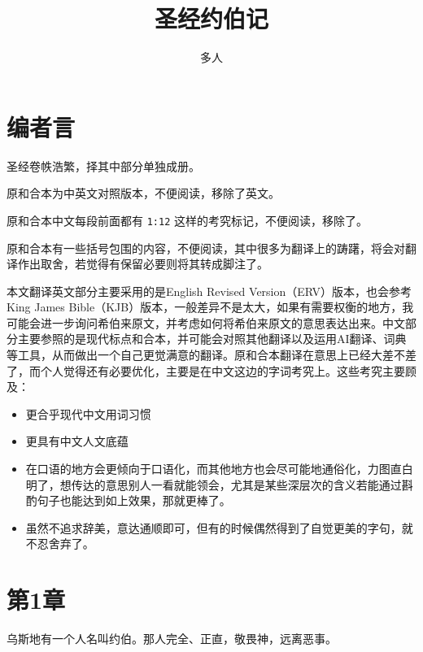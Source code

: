 \documentclass[12pt,oneside]{book}
\title{圣经约伯记}
\author{多人}
\begin{document}





\frontmatter
{}
\chapter*{编者言}
圣经卷帙浩繁，择其中部分单独成册。

原和合本为中英文对照版本，不便阅读，移除了英文。

原和合本中文每段前面都有 \verb+1:12+ 这样的考究标记，不便阅读，移除了。

原和合本有一些括号包围的内容，不便阅读，其中很多为翻译上的踌躇，将会对翻译作出取舍，若觉得有保留必要则将其转成脚注了。

本文翻译英文部分主要采用的是English Revised Version（ERV）版本，也会参考King James Bible（KJB）版本，一般差异不是太大，如果有需要权衡的地方，我可能会进一步询问希伯来原文，并考虑如何将希伯来原文的意思表达出来。中文部分主要参照的是现代标点和合本，并可能会对照其他翻译以及运用AI翻译、词典等工具，从而做出一个自己更觉满意的翻译。原和合本翻译在意思上已经大差不差了，而个人觉得还有必要优化，主要是在中文这边的字词考究上。这些考究主要顾及：


\begin{itemize}
\item 更合乎现代中文用词习惯
\item 更具有中文人文底蕴
\item 在口语的地方会更倾向于口语化，而其他地方也会尽可能地通俗化，力图直白明了，想传达的意思别人一看就能领会，尤其是某些深层次的含义若能通过斟酌句子也能达到如上效果，那就更棒了。
\item 虽然不追求辞美，意达通顺即可，但有的时候偶然得到了自觉更美的字句，就不忍舍弃了。
\end{itemize}



\setcounter{tocdepth}{2}    
\tableofcontents

\mainmatter
\chapter{第1章}
乌斯地有一个人名叫约伯。那人完全、正直，敬畏神，远离恶事。
\end{document}
